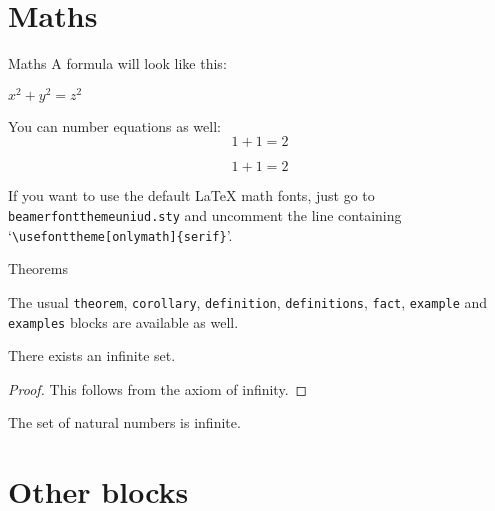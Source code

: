 \documentclass[usenames,dvipsnames]{beamer}
\begin{document}
\section{Maths}

\begin{frame}{Maths}
A formula will look like this: 
\begin{center}
 $x^2 + y^2 = z^2$
\end{center}

You can number equations as well:
\begin{equation}
1+1=2
\end{equation}

\begin{equation}
1+1=2 \tag{custom label!}
\end{equation}

\vskip 0.5cm

If you want to use the default \LaTeX{} math fonts, just go to \texttt{beamerfontthemeuniud.sty} and uncomment the line containing `\texttt{\textbackslash usefonttheme[onlymath]\{serif\}}'.

\end{frame}

\begin{frame}{Theorems}

The usual \texttt{theorem}, \texttt{corollary}, \texttt{definition}, \texttt{definitions}, \texttt{fact}, \texttt{example} and \texttt{examples} blocks are available as well.

\begin{theorem}
There exists an infinite set.
\end{theorem}
\begin{proof}
This follows from the axiom of infinity.
\end{proof}
\begin{example}
The set of natural numbers is infinite.
\end{example}

\end{frame}

\section{Other blocks}
\end{document}
